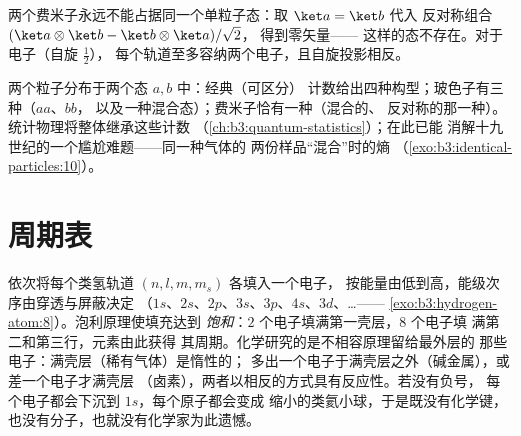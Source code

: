 \begin{corollary}[泡利不相容原理]\label{cor:b3:identical-particles:pauli}
两个费米子永远不能占据同一个单粒子态：取 $\ket a = \ket b$ 代入
反对称组合 $(\ket a\otimes\ket b - \ket b\otimes\ket a)/\sqrt2$，
得到零矢量——
这样的态不存在。对于电子（自旋 $\tfrac12$），
每个轨道至多容纳两个电子，且自旋投影相反。
\end{corollary}

\begin{example}[不同的计数方式]\label{ex:b3:identical-particles:counting}
两个粒子分布于两个态 $a, b$ 中：经典（可区分）
计数给出四种构型；玻色子有三种（$aa$、$bb$，
以及\emph{一}种混合态）；费米子恰有一种（混合的、
反对称的那一种）。统计物理将整体继承这些计数
（\cref{ch:b3:quantum-statistics}）；在此已能
消解十九世纪的一个尴尬难题——同一种气体的
两份样品“混合”时的熵
（\cref{exo:b3:identical-particles:10}）。
\end{example}

\section{周期表}

\begin{proposition}[壳层，以及化学存在的原因]\label{prop:b3:identical-particles:periodic}
依次将每个类氢轨道 $(n, l, m, m_s)$ 各填入一个电子，
按能量由低到高，能级次序由穿透与屏蔽决定
（$1s$、$2s$、$2p$、$3s$、$3p$、$4s$、$3d$、\dots ——
\cref{exo:b3:hydrogen-atom:8}）。泡利原理使填充达到
\emph{饱和}：$2$ 个电子填满第一壳层，$8$ 个电子填
满第二和第三行，元素由此获得
其周期。化学研究的是不相容原理留给最外层的
那些电子：满壳层（稀有气体）是惰性的；
多出一个电子于满壳层之外（碱金属），或差一个电子才满壳层
（卤素），两者以相反的方式具有反应性。若没有负号，
每个电子都会下沉到 $1s$，每个原子都会变成
缩小的类氦小球，于是既没有化学键，
也没有分子，也就没有化学家为此遗憾。
\end{proposition}
\admitted

